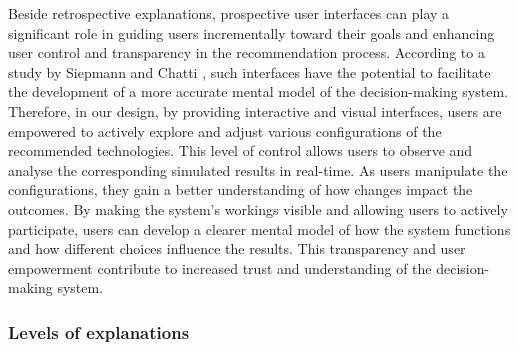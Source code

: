 Beside retrospective explanations, prospective user interfaces can play a significant role in guiding users incrementally toward their goals and enhancing user control and transparency in the recommendation process. 
According to a study by Siepmann and Chatti \cite{Siepmann2023}, such interfaces have the potential to facilitate the development of a more accurate mental model of the decision-making system.
Therefore, in our design, by providing interactive and visual interfaces, users are empowered to actively explore and adjust various configurations of the recommended technologies. 
This level of control allows users to observe and analyse the corresponding simulated results in real-time. 
As users manipulate the configurations, they gain a better understanding of how changes impact the outcomes. 
By making the system's workings visible and allowing users to actively participate, users can develop a clearer mental model of how the system functions and how different choices influence the results. 
This transparency and user empowerment contribute to increased trust and understanding of the decision-making system.


\subsubsection{Levels of explanations}

